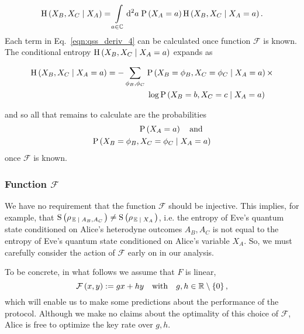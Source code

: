 \begin{equation}\label{eqn:qss_deriv_4}
\text{H}\left(X_B, X_C \; \middle| \; X_A\right) = \int\limits_{a \in \mathbb{C}} \mathop{}\!\mathrm{d^2} a \; \text{P}\left(X_A = a\right) \text{H}\left(X_B, X_C \; \middle| \; X_A = a\right).
\end{equation}
Each term in Eq.~\ref{eqn:qss_deriv_4} can be calculated once function $\mathcal{F}$ is known. The conditional entropy $\text{H}\left(X_B, X_C \; \middle| \; X_A = a\right)$ expands as 

\begin{align}
\text{H}\left(X_B, X_C \given X_A=a\right) = - \sum_{\phi_B, \phi_C} \;  &\text{P}\left(X_B=\phi_B, X_C=\phi_C \given X_A=a\right) \times \notag \\
%
&\log \text{P}\left(X_B=b, X_C=c \given X_A=a\right) \label{eqn:qss_deriv_4_1}
\end{align}

\noindent and so all that remains to calculate are the probabilities 
\begin{align}
\label{eqn:qss_prob1} \text{P}\left(X_A=a\right) \qq{and} \\
\label{eqn:qss_prob2} \text{P}\left(X_B=\phi_B, X_C=\phi_C \given X_A=a\right)
\end{align}
once $\mathcal{F}$ is known.


\subsubsection{Function $\mathcal{F}$}


We have no requirement that the function $\mathcal{F}$ should be injective. This implies, for example, that $\text{S}\left(\rho_{\left.\mathbb{E} \; \middle| \; A_B, A_C\right.}\right) \ne \text{S}\left(\rho_{\left. \mathbb{E} \; \middle| \; X_A\right.}\right)$, i.e. the entropy of Eve's quantum state conditioned on Alice's heterodyne outcomes $A_B, A_C$ is not equal to the entropy of Eve's quantum state conditioned on Alice's variable $X_A$. So, we must carefully consider the action of $\mathcal{F}$ early on in our analysis. 

To be concrete, in what follows we assume that $F$ is linear,
\begin{equation}\label{eqn:qss_F_linear}
\mathcal{F}\left(x, y\right) := g x + h y \qq{with} g, h \in \mathbb{R}\setminus \left\{0\right\},
\end{equation} 
which will enable us to make some predictions about the performance of the protocol. Although we make no claims about the optimality of this choice of $\mathcal{F}$, Alice is free to optimize the key rate over $g, h$.

